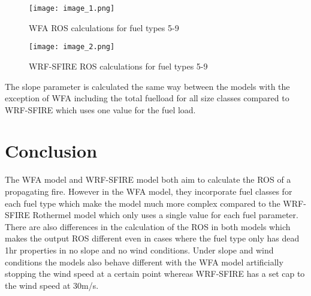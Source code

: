 \documentclass{article}
\begin{document}
\begin{figure}[h]
\begin{minipage}{0.45\linewidth}
\label{WFA_ROS_2}
\texttt{[image: image\_1.png]}
\caption{WFA ROS calculations for fuel types 5-9}
\end{minipage}
\hfill
\begin{minipage}[c]{0.45\linewidth}
\label{WRF_ROS_2}
\texttt{[image: image\_2.png]}
\caption{WRF-SFIRE ROS calculations for fuel types 5-9}
\end{minipage}
\end{figure}
 

The slope parameter is calculated the same way between the models with the exception of WFA including the total fuelload for all size classes compared to WRF-SFIRE which uses one value for the fuel load. 
\section{Conclusion}
The WFA model and WRF-SFIRE model both aim to calculate the ROS of a propagating fire. However in the WFA model, they incorporate fuel classes for each fuel type which make the model much more complex compared to the WRF-SFIRE Rothermel model which only uses a single value for each fuel parameter. There are also differences in the calculation of the ROS in both models which makes the output ROS different even in cases where the fuel type only has dead 1hr properties in no slope and no wind conditions. Under slope and wind conditions the models also behave different with the WFA model artificially stopping the wind speed at a certain point whereas WRF-SFIRE has a set cap to the wind speed at 30m/s. 


\newpage


\end{document}
